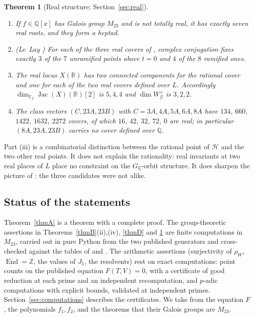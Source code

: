 \documentclass[11pt]{amsart}
\newtheorem{maintheorem}{Theorem}
\theoremstyle{definition}
\newcommand{\QQ}{\mathbb{Q}}
\newcommand{\ZZ}{\mathbb{Z}}
\newcommand{\RR}{\mathbb{R}}
\newcommand{\FF}{\mathbb{F}}
\newcommand{\End}{\operatorname{End}}
\newcommand{\Jac}{\operatorname{Jac}}
\newcommand{\M}{M_{23}}
\newcommand{\cG}{\mathcal{G}}
\newcommand{\cH}{\mathcal{H}}
\newcommand{\GQ}{G_{\QQ}}
\begin{document}
\begin{maintheorem}[Real structure; Section~\ref{sec:real}]\label{thmE}
\begin{enumerate}[label=\textup{(\roman*)}]
\item If $f\in\QQ[x]$ has Galois group $\M$ and is not totally real, it has exactly seven real roots, and they form a heptad.
\item \textup{(Le~Lay \cite[Thm.~8.20]{LeLay26})} For each of the three real covers of \cite{Janik26}, complex conjugation fixes exactly $3$ of the $7$ unramified points above $t=0$ and $4$ of the $8$ ramified ones.
\item The real locus $X(\RR)$ has two connected components for the rational cover and one for each of the two real covers defined over $L$. Accordingly $\dim_{\FF_2}\Jac(X)(\RR)[2]$ is $5,4,4$ and $\dim W_\cG^{\,c}$ is $3,2,2$.
\item The class vectors $(C,23A,23B)$ with $C=3A,4A,5A,6A,8A$ have $134$, $660$, $1422$, $1632$, $2272$ covers, of which $16$, $42$, $32$, $72$, $0$ are real; in particular $(8A,23A,23B)$ carries no cover defined over $\QQ$.
\end{enumerate}
\end{maintheorem}

Part (iii) is a combinatorial distinction between the rational point of $\cH$ and the two other real points. It does not explain the rationality: real invariants at two real places of $L$ place no constraint on the $\GQ$-orbit structure. It does sharpen the picture of \cite{Janik26}: the three candidates were not alike.

\subsection{Status of the statements}
Theorem~\ref{thmA} is a theorem with a complete proof. The group-theoretic assertions in Theorems~\ref{thmB}(ii),(iv), \ref{thmD} and \ref{thmE} are finite computations in $\M$, carried out in pure Python from the two published generators and cross-checked against the tables of \cite{HJLPPZ26} and \cite{Janik26}. The arithmetic assertions (surjectivity of $\rho_W$, $\End=\ZZ$, the values of $J_5$, the resolvents) rest on exact computations: point counts on the published equation $F(T,V)=0$, with a certificate of good reduction at each prime and an independent recomputation, and $p$-adic computations with explicit bounds, validated at independent primes. Section~\ref{sec:computations} describes the certificates. We take from \cite{HJLPPZ26} the equation $F$, the polynomials $f_1,f_2$, and the theorems that their Galois groups are $\M$.
\end{document}

